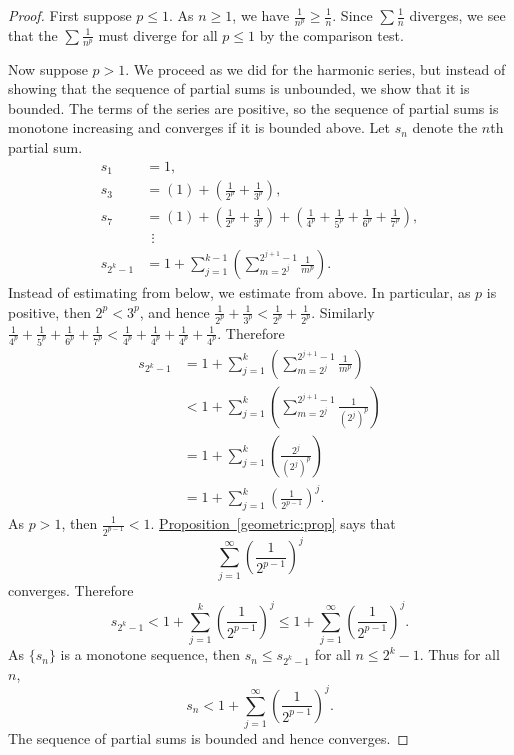 \documentclass[12pt]{book}
\theoremstyle{plain}
\theoremstyle{remark}
\theoremstyle{definition}
\theoremstyle{exercise}
\theoremstyle{example}
\newcommand{\propref}[1]{\hyperref[#1]{Proposition~\ref*{#1}}}
\begin{document}
\begin{proof}
First suppose $p \leq 1$.
As $n \geq 1$, we have
$\frac{1}{n^p} \geq \frac{1}{n}$.  Since
$\sum \frac{1}{n}$ diverges, we see that the 
$\sum \frac{1}{n^p}$ must diverge for all $p \leq 1$ by the comparison test.

Now suppose $p > 1$.
We proceed as we did for the
harmonic series, but instead of showing that the sequence
of partial sums is unbounded, we show that it is bounded.
The terms of the series are positive, so the sequence of partial sums
is monotone increasing and converges if it is bounded
above.
Let $s_n$ denote the $n$th partial sum.
\begin{align*}
 s_1 & = 1 , \\
 s_3 & = \left( 1 \right) + \left( \frac{1}{2^p} + \frac{1}{3^p} \right) , \\
 s_7 & = \left( 1 \right) + \left( \frac{1}{2^p} + \frac{1}{3^p} \right) +
        \left( \frac{1}{4^p} + \frac{1}{5^p} + \frac{1}{6^p} + \frac{1}{7^p} \right) , \\
& ~~ \vdots \\
 s_{2^k - 1} &= 
1 + 
\sum_{j=1}^{k-1}
\left(
\sum_{m=2^j}^{2^{j+1}-1} \frac{1}{m^p}
\right) .
\end{align*}
Instead of estimating from below, we estimate from above.  In particular,
as $p$ is positive, then $2^p < 3^p$, and hence
$\frac{1}{2^p} + \frac{1}{3^p} <
\frac{1}{2^p} + \frac{1}{2^p}$.  Similarly
$\frac{1}{4^p} + \frac{1}{5^p} +
\frac{1}{6^p} + \frac{1}{7^p} <
\frac{1}{4^p} + \frac{1}{4^p} +
\frac{1}{4^p} + \frac{1}{4^p}$.  Therefore
\begin{equation*}
\begin{split}
s_{2^k-1}
& =
1+
\sum_{j=1}^k
\left(
\sum_{m=2^{j}}^{2^{j+1}-1} \frac{1}{m^p}
\right) 
\\
& <
1+
\sum_{j=1}^k
\left(
\sum_{m=2^{j}}^{2^{j+1}-1} \frac{1}{{(2^j)}^p}
\right) 
\\
& =
1+
\sum_{j=1}^k
\left(
\frac{2^j}{{(2^j)}^p}
\right) 
\\
& =
1+
\sum_{j=1}^k
{\left(
\frac{1}{2^{p-1}}
\right)}^j .
\end{split}
\end{equation*}
As $p > 1$, then $\frac{1}{2^{p-1}} < 1$.
\propref{geometric:prop} says that
\begin{equation*}
\sum_{j=1}^\infty
{\left(
\frac{1}{2^{p-1}}
\right)}^j
\end{equation*}
converges.  Therefore
\begin{equation*}
s_{2^k-1} < 
1+
\sum_{j=1}^k
{\left(
\frac{1}{2^{p-1}}
\right)}^j 
\leq 
1+
\sum_{j=1}^\infty
{\left(
\frac{1}{2^{p-1}}
\right)}^j .
\end{equation*}
As $\{ s_n \}$ is a monotone sequence, then $s_n \leq s_{2^k-1}$
for all $n \leq 2^k-1$.  Thus for all $n$,
\begin{equation*}
s_n < 
1+
\sum_{j=1}^\infty
{\left(
\frac{1}{2^{p-1}}
\right)}^j .
\end{equation*}
The sequence of partial sums is bounded and hence converges.
\end{proof}
\end{document}
